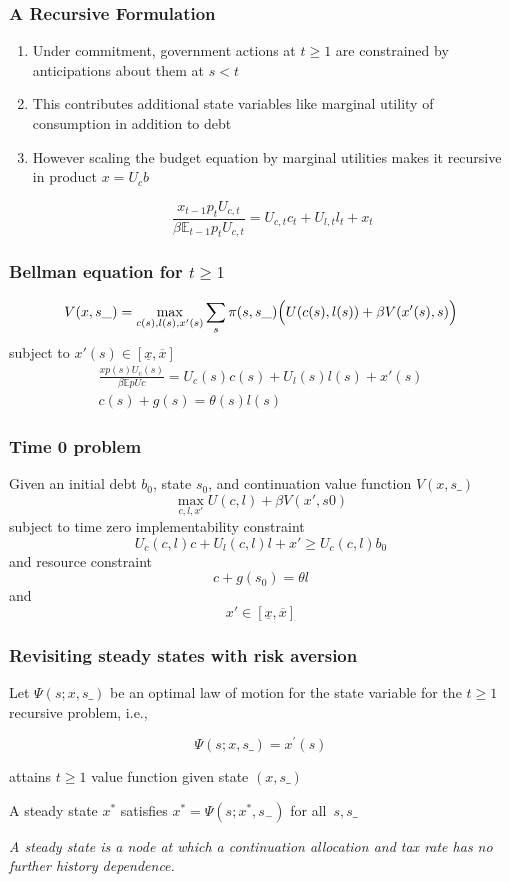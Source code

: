 \documentclass{beamer}
\newcommand{\EE}{\mathbb E}
\begin{document}
 \begin{frame}
	\frametitle{A Recursive Formulation}
	
	\begin{enumerate}
	 \item Under commitment, government actions at $t \geq 1$ are constrained by  anticipations about them at $s < t$ 
	 \item This contributes additional state variables like marginal utility of consumption in addition to debt
	 \item However scaling the budget equation by marginal utilities makes it recursive in product $x=U_c b$
	
	\[
		\frac{x_{t-1} p_t U_{c,t}}{\beta \EE_{t-1} p_t U_{c,t}}  = U_{c,t}c_t+U_{l,t} l_t + x_t
	\]
	
	\end{enumerate}
	
	
	\end{frame}
	\begin{frame}
	\frametitle{Bellman equation for $t\geq1$}
	\[
		V(x,s\_) = \max_{c(s),l(s),x'(s)} \sum_s \pi(s,s\_)\Bigl(U(c(s),l(s)) + \beta V(x'(s),s)\Bigr)
	\]subject to $x'(s)\in [\underline x,\overline x]$
	\begin{align*}
		\frac{x p(s) U_c(s)}{\beta\EE pUc} =U_c(s)c(s)+U_l(s)l(s) + x'(s)\\
		c(s) + g(s) = \theta(s)l(s)
	\end{align*}
	
 \end{frame}
\begin{frame}
	\frametitle{Time 0 problem}
	Given an initial  debt $b_0$, state $s_0$,  and continuation value function $V(x,s\_)$ 
	\[
		\max_{c,l,x'} U(c,l) +\beta V(x',s0)
	\]subject to  time zero implementability constraint
	\[
		U_{c}(c,l)c + U_l(c,l) l + x' \geq U_c(c,l) b_0
	\]and  resource constraint
	\[
		c+ g(s_0) = \theta l
	\]and
	\[
		x' \in [\underline x,\overline x]
	\]
\end{frame}



\begin{frame}
 \frametitle{Revisiting steady states with risk aversion}
Let $\Psi \left( s;{x},s\_\right) $ be an optimal  law of motion for the state variable
for the $t\geq1$ recursive problem, i.e.,


\[\Psi \left( s;{x},%
s\_\right) = x^{\prime }(s)\]

attains $t\geq1$ value function given state $\left({x},s\_\right) $

\begin{definition}
 A steady state  ${x}^{*} $  satisfies ${ x}^{*}  =\Psi \left( s;{x}^{*},s_{-}\right) $ for all $%
\,s,s\_$
\end{definition}
\vspace{3mm}
\emph{A steady state is a node at which a continuation allocation and tax rate has no further history dependence. }

 \end{frame}
\end{document}

